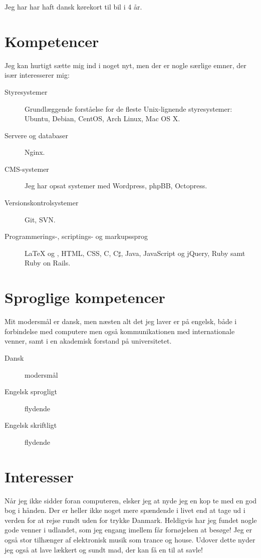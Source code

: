 \documentclass[margin,line,a4paper]{resume}
\begin{document}
\begin{resume}
Jeg har har haft dansk kørekort til bil i 4 år.

\section{\mysidestyle Kompetencer} \vspace{1mm}
Jeg kan hurtigt sætte mig ind i noget nyt, men der er nogle særlige
emner, der især interesserer mig:
\vspace{0.5cm}
\begin{description}
  \item[Styresystemer] Grundlæggende forståelse for de fleste
    Unix-lignende styresystemer: Ubuntu, Debian, CentOS, Arch Linux, Mac OS
    X.
  \item[Servere og databaser] Nginx. 
  \item[CMS-systemer] Jeg har opsat systemer med Wordpress, phpBB,
    Octopress.
  \item[Versionskontrolsystemer] Git, SVN.
  \item[Programmerings-, scriptings- og markupssprog] \LaTeX{} og
  \XeTeX{}, HTML, CSS, C, C$\sharp$, Java, JavaScript og jQuery, Ruby samt Ruby
  on Rails.
\end{description}

\section{\mysidestyle Sproglige kompetencer}
Mit modersmål er dansk, men næsten alt det jeg laver er på engelsk, både
i forbindelse med computere men også kommunikationen med internationale
venner, samt i en akademisk forstand på universitetet.

\begin{description}
  \item[Dansk] modersmål
  \item[Engelsk sprogligt] flydende
  \item[Engelsk skriftligt] flydende
\end{description}

\section{\mysidestyle Interesser}
Når jeg ikke sidder foran computeren, elsker jeg at nyde jeg en kop
te med en god bog i hånden. Der er heller ikke noget mere spændende
i livet end at tage ud i verden for at rejse rundt uden for trykke
Danmark. Heldigvis har jeg fundet nogle gode venner i udlandet, som jeg
engang imellem får fornøjelsen at besøge! Jeg er også stor tilhænger af
elektronisk musik som trance og house. Udover dette nyder jeg også at
lave lækkert og sundt mad, der kan få en til at savle!

\end{resume}
\end{document}
